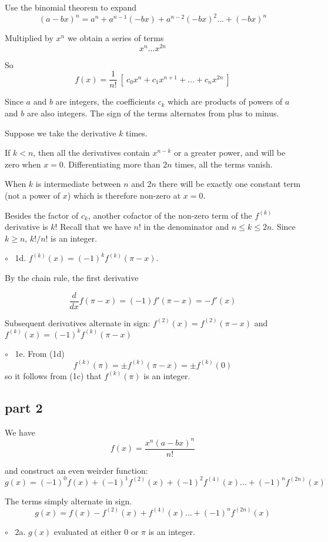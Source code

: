 \documentclass[11pt, oneside]{article}
\begin{document}
Use the binomial theorem to expand
\[ (a - bx)^n = a^n + a^{n-1}(-bx) + a^{n-2}(-bx)^2 \dots + (-bx)^n \]

Multiplied by $x^n$ we obtain a series of terms
\[ x^n \dots x^{2n} \]

So
\[ f(x) = \frac{1}{n!} \ [ \ c_0 x^n + c_1 x^{n+1} + \dots + c_n x^{2n} \ ] \]

Since $a$ and $b$ are integers, the coefficients $c_k$ which are products of powers of $a$ and $b$ are also integers.  The sign of the terms alternates from plus to minus.

Suppose we take the derivative $k$ times.

If $k < n$, then all the derivatives contain $x^{n-k}$ or a greater power, and will be zero when $x = 0$.  Differentiating more than $2n$ times, all the terms vanish.

When $k$ is intermediate between $n$ and $2n$ there will be exactly one constant term (not a power of $x$) which is therefore non-zero at $x = 0$.

Besides the factor of $c_k$, another cofactor of the non-zero term of the $f^{(k)}$ derivative is $k!$  Recall that we have $n!$ in the denominator and $n \le k \le 2n$.  Since $k \ge n$, $k!/n!$ is an integer.

$\circ$ \ 1d.  $f^{(k)}(x) = (-1)^{k} f^{(k)} (\pi - x)$.

By the chain rule, the first derivative 

\[ \frac{d}{dx} f(\pi - x) = (-1) f'(\pi - x) = - f'(x)  \]

Subsequent derivatives alternate in sign:  $f^{(2)}(x) = f^{(2)}(\pi - x)$ and $f^{(k)}(x) = (-1)^k  f^{(k)}(\pi - x)$

$\circ$ \ 1e.  From (1d)
\[ f^{(k)}(\pi) = \pm f^{(k)} (\pi - x) = \pm f^{(k)} (0) \]
so it follows from (1c) that $f^{(k)}(\pi)$ is an integer.

\subsection*{part 2}
We have
\[ f(x) = \frac{x^n (a-bx)^n}{n!} \]

and construct an even weirder function:
\[ g(x) = (-1)^0 f(x) + (-1)^1 f^{(2)}(x) + (-1)^2 f^{(4)}(x) \dots + (-1)^n f^{(2n)}(x) \]

The terms simply alternate in sign.
\[ g(x) = f(x) -f^{(2)}(x) + f^{(4)}(x) \dots + (-1)^n f^{(2n)}(x) \]

$\circ$ \ 2a.  $g(x)$ evaluated at either $0$ or $\pi$ is an integer.
\end{document}

